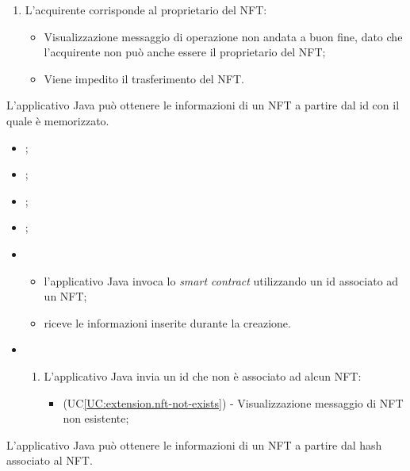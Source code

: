 \begin{itemize}
\begin{enumerate}[label=\lett]
    \item L'acquirente corrisponde al proprietario del NFT:
    \begin{itemize}
      \item Visualizzazione messaggio di operazione non andata a buon fine, dato che l'acquirente non può anche essere il proprietario del NFT;
      \item Viene impedito il trasferimento del NFT.
    \end{itemize}
  \end{enumerate}
\end{itemize}

\label{UC:get-nft-by-id}

L'applicativo Java può ottenere le informazioni di un NFT a partire dal id con il quale è memorizzato.

\begin{itemize}
  \item {};
  \item {};
  \item {};
  \item {};
  \item \UCMain
  \begin{itemize}
    \item l'applicativo Java invoca lo \textit{smart contract} utilizzando un id associato ad un NFT;
    \item riceve le informazioni inserite durante la creazione.
  \end{itemize}

  \item \UCExt
  \begin{enumerate}[label=\lett]
    \item L'applicativo Java invia un id che non è associato ad alcun NFT:
    \begin{itemize}
      \item (UC\ref{UC:extension.nft-not-exists}) - Visualizzazione messaggio di NFT non esistente;
    \end{itemize}
  \end{enumerate}
\end{itemize}

\label{UC:get-nft-by-hash}

L'applicativo Java può ottenere le informazioni di un NFT a partire dal hash associato al NFT.

